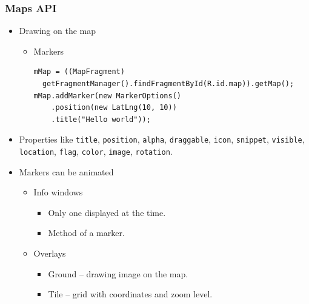 \documentclass[10pt,xcolor=pdflatex]{beamer}
\begin{document}
\begin{frame}[fragile]\frametitle{Maps API}
\begin{itemize}
	\item Drawing on the map
      \begin{itemize}
    	\item Markers
		  \lstset{language=Java, basicstyle=\footnotesize\ttfamily}
          \begin{lstlisting}
mMap = ((MapFragment) 
  getFragmentManager().findFragmentById(R.id.map)).getMap();
mMap.addMarker(new MarkerOptions()
    .position(new LatLng(10, 10))
    .title("Hello world"));
\end{lstlisting}
      \end{itemize}
    \item Properties like \texttt{title}, \texttt{position}, \texttt{alpha}, \texttt{draggable}, \texttt{icon}, \texttt{snippet}, \texttt{visible}, \texttt{location}, \texttt{flag}, \texttt{color}, \texttt{image}, \texttt{rotation}.
    \item Markers can be animated
      \begin{itemize}
    	\item Info windows
          \begin{itemize}
            \item Only one displayed at the time.
	        \item Method of a marker.
          \end{itemize}
    	\item Overlays
          \begin{itemize}
            \item Ground -- drawing image on the map.
	        \item Tile -- grid with coordinates and zoom level.
          \end{itemize}
      \end{itemize}
\end{itemize}
\end{frame}
\end{document}
